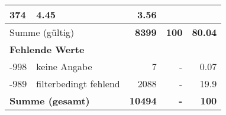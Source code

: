 \begin{longtable}{lXrrr}
       \num{374} &
       \num[round-mode=places,round-precision=2]{4,45} &
         \num[round-mode=places,round-precision=2]{3,56} \\
     \midrule
     \multicolumn{2}{l}{Summe (gültig)} &
       \textbf{\num{8399}} &
     \textbf{100} &
       \textbf{\num[round-mode=places,round-precision=2]{80,04}} \\
     \multicolumn{5}{l}{\textbf{Fehlende Werte}}\\
       -998 &
       keine Angabe &
         \num{7} &
        - &
         \num[round-mode=places,round-precision=2]{0,07} \\
       -989 &
       filterbedingt fehlend &
         \num{2088} &
        - &
         \num[round-mode=places,round-precision=2]{19,9} \\
     \midrule
     \multicolumn{2}{l}{\textbf{Summe (gesamt)}} &
          \textbf{\num{10494}} &
        \textbf{-} &
        \textbf{100} \\
     \bottomrule
     \end{longtable}
     

